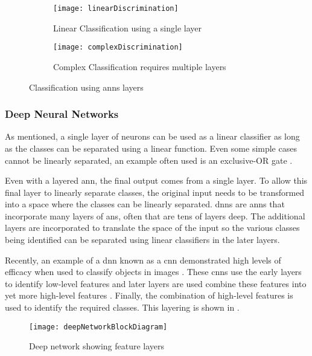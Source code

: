 \begin{figure}[h]
\centering
  \begin{subfigure}{.4\textwidth}
    \centering
    \texttt{[image: linearDiscrimination]}
    \captionsetup{width=.8\textwidth, justification=centering, skip=20pt}
    \caption{Linear Classification using a single layer}
    \label{fig:linear discrimination}
  \end{subfigure}%
  \begin{subfigure}{.4\textwidth}
    \centering
    \texttt{[image: complexDiscrimination]}
    \captionsetup{width=.8\textwidth, justification=centering, skip=10pt}
    \caption{Complex Classification requires multiple layers}
    \label{fig:complex discrimination}
  \end{subfigure}
\captionsetup{justification=centering, skip=10pt}
\caption{Classification using \acp{ann} layers \cite{NNintro_Bullinaria}}
\label{fig:Discrimination}
\end{figure}


\subsubsection{Deep Neural Networks}
\label{sec:Deep Neural Networks}

As mentioned, a single layer of neurons can be used as a linear classifier as long as the classes can be separated using a linear function.
Even some simple cases cannot be linearly separated, an example often used is an exclusive-OR gate \cite{NNintro_Bullinaria}.

Even with a layered \ac{ann}, the final output comes from a single layer. To allow this final layer to linearly separate classes, the original input needs to be transformed into a space where the classes can be linearly separated.
\acfp{dnn} are \acp{ann} that incorporate many layers of \acp{an}, often that are tens of layers deep.
The additional layers are incorporated to translate the space of the input so the various classes being identified can be separated using linear classifiers in the later layers.

Recently, an example of a \ac{dnn} known as a \acf{cnn} demonstrated high levels of efficacy when used to classify objects in images \cite{krizhevsky2012imagenet}.
These \acp{cnn} use the early layers to identify low-level features and later layers are used combine these features into yet more high-level features \cite{deeplearning4j}\cite{Kwolek2005}\cite{wikipedia_deep_learning}.
Finally, the combination of high-level features is used to identify the required classes.
This layering is shown in .
\begin{figure}[h]
\centering
\texttt{[image: deepNetworkBlockDiagram]}
\captionsetup{justification=centering, skip=5pt}
\caption{Deep network showing feature layers}
\label{fig:Deep network showing feature layers}
\end{figure}

